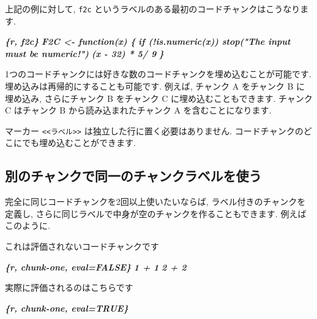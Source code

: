 \documentclass[
  11pt,
  lualatex,
  ja=standard]{bxjsreport}
\newenvironment{Shaded}{\begin{snugshade}}{\end{snugshade}}
\newcommand{\InformationTok}[1]{\textcolor[rgb]{0.56,0.35,0.01}{\textbf{\textit{#1}}}}
\newcommand{\NormalTok}[1]{#1}
\begin{document}
上記の例に対して, \texttt{f2c} というラベルのある最初のコードチャンクはこうなります.

\begin{Shaded}
\begin{Highlighting}[]
\InformationTok{\textasciigrave{}\textasciigrave{}\textasciigrave{}\{r, f2c\}}
\InformationTok{F2C \textless{}{-} function(x) \{}
\InformationTok{  if (!is.numeric(x)) stop("The input must be numeric!")}
\InformationTok{  (x {-} 32) * 5/ 9}
\InformationTok{\}}
\InformationTok{\textasciigrave{}\textasciigrave{}\textasciigrave{}}
\end{Highlighting}
\end{Shaded}

1つのコードチャンクには好きな数のコードチャンクを埋め込むことが可能です. 埋め込みは再帰的にすることも可能です. 例えば, チャンク A をチャンク B に埋め込み, さらにチャンク B をチャンク C に埋め込むこともできます. チャンク C はチャンク B から読み込まれたチャンク A を含むことになります.

マーカー \texttt{\textless{}\textless{}ラベル\textgreater{}\textgreater{}} は独立した行に置く必要はありません. コードチャンクのどこにでも埋め込むことができます.

\hypertarget{same-label}{%
\subsection{別のチャンクで同一のチャンクラベルを使う}\label{same-label}}

完全に同じコードチャンクを2回以上使いたいならば, ラベル付きのチャンクを定義し, さらに同じラベルで中身が空のチャンクを作ることもできます. 例えばこのように.

\begin{Shaded}
\begin{Highlighting}[]
\NormalTok{これは評価されないコードチャンクです}

\InformationTok{\textasciigrave{}\textasciigrave{}\textasciigrave{}\{r, chunk{-}one, eval=FALSE\}}
\InformationTok{1 + 1}
\InformationTok{2 + 2}
\InformationTok{\textasciigrave{}\textasciigrave{}\textasciigrave{}}

\NormalTok{実際に評価されるのはこちらです}

\InformationTok{\textasciigrave{}\textasciigrave{}\textasciigrave{}\{r, chunk{-}one, eval=TRUE\}}
\InformationTok{\textasciigrave{}\textasciigrave{}\textasciigrave{}}
\end{Highlighting}
\end{Shaded}
\end{document}

